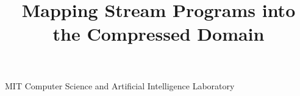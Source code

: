 \documentclass[preprint,nocopyrightspace]{sigplanconf}
\begin{document}


\title{Mapping Stream Programs into the Compressed Domain}


           {MIT Computer Science and Artificial Intelligence Laboratory}

\maketitle

\begin{abstract}

\end{abstract}







%


%


\end{document}
